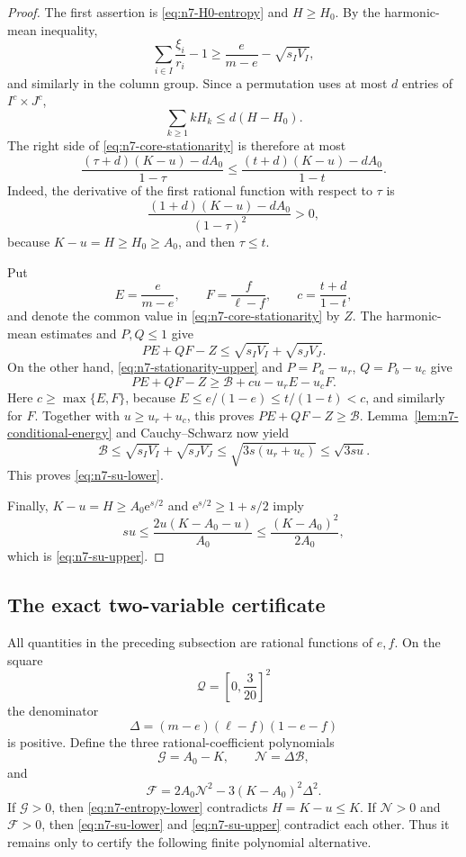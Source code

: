 \documentclass[11pt]{article}
\theoremstyle{definition}
\newcommand{\1}{\mathbf{1}}
\newcommand{\e}{\mathrm{e}}
\begin{document}
\begin{proof}
The first assertion is \eqref{eq:n7-H0-entropy} and $H\ge H_0$.
By the harmonic-mean inequality,
\[
 \sum_{i\in I}\frac{\xi_i}{r_i}-1
 \ge\frac{e}{m-e}-\sqrt{s_IV_I},
\]
and similarly in the column group.  Since a permutation uses at most $d$
entries of $I^c\times J^c$,
\[
 \sum_{k\ge1}kH_k\le d(H-H_0).
\]
The right side of \eqref{eq:n7-core-stationarity} is therefore at most
\[
 \frac{(\tau+d)(K-u)-dA_0}{1-\tau}
 \le
 \frac{(t+d)(K-u)-dA_0}{1-t}.
 \tag{8.34}\label{eq:n7-stationarity-upper}
\]
Indeed, the derivative of the first rational function with respect to
$\tau$ is
\[
 \frac{(1+d)(K-u)-dA_0}{(1-\tau)^2}>0,
\]
because $K-u=H\ge H_0\ge A_0$, and then $\tau\le t$.

Put
\[
 E=\frac{e}{m-e},\qquad F=\frac{f}{\ell-f},\qquad
 c=\frac{t+d}{1-t},
\]
and denote the common value in \eqref{eq:n7-core-stationarity} by $Z$.
The harmonic-mean estimates and $P,Q\le1$ give
\[
 PE+QF-Z\le\sqrt{s_IV_I}+\sqrt{s_JV_J}.
 \tag{8.35}\label{eq:n7-error-upper}
\]
On the other hand, \eqref{eq:n7-stationarity-upper} and
$P=P_a-u_r$, $Q=P_b-u_c$ give
\[
 PE+QF-Z
 \ge \mathcal B+cu-u_rE-u_cF.
\]
Here $c\ge\max\{E,F\}$, because
$E\le e/(1-e)\le t/(1-t)<c$, and similarly for $F$.
Together with $u\ge u_r+u_c$, this proves
$PE+QF-Z\ge\mathcal B$.  Lemma~\ref{lem:n7-conditional-energy} and
Cauchy--Schwarz now yield
\[
 \mathcal B
 \le\sqrt{s_IV_I}+\sqrt{s_JV_J}
 \le\sqrt{3s(u_r+u_c)}
 \le\sqrt{3su}.
\]
This proves \eqref{eq:n7-su-lower}.

Finally, $K-u=H\ge A_0\e^{s/2}$ and
$\e^{s/2}\ge1+s/2$ imply
\[
 su\le\frac{2u(K-A_0-u)}{A_0}
 \le\frac{(K-A_0)^2}{2A_0},
\]
which is \eqref{eq:n7-su-upper}.
\end{proof}

\subsection{The exact two-variable certificate}

All quantities in the preceding subsection are rational functions of $e,f$.
On the square
\[
 \mathcal Q=\left[0,\frac3{20}\right]^2
\]
the denominator
\[
 \Delta=(m-e)(\ell-f)(1-e-f)
\]
is positive.  Define the three rational-coefficient polynomials
\[
 \mathcal G=A_0-K,
 \qquad
 \mathcal N=\Delta\mathcal B,
\]
and
\[
 \mathcal F=2A_0\mathcal N^2
 -3(K-A_0)^2\Delta^2.
 \tag{8.36}\label{eq:n7-GNF}
\]
If $\mathcal G>0$, then \eqref{eq:n7-entropy-lower} contradicts
$H=K-u\le K$.  If $\mathcal N>0$ and $\mathcal F>0$, then
\eqref{eq:n7-su-lower} and \eqref{eq:n7-su-upper} contradict each other.
Thus it remains only to certify the following finite polynomial alternative.
\end{document}
